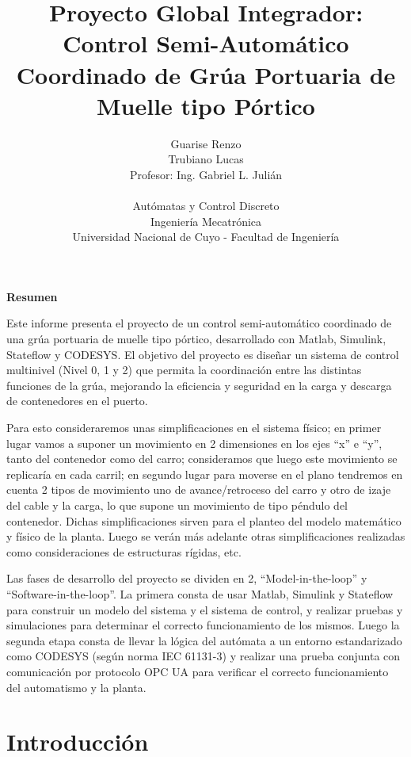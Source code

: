 \documentclass[11pt]{article}
\title{
	Proyecto Global Integrador:
	\\
	Control Semi-Automático Coordinado de Grúa Portuaria de Muelle tipo Pórtico
}
\author{
	Guarise Renzo
	\\
	Trubiano Lucas
	\\
	Profesor: Ing. Gabriel L. Julián
	\\
	\\
	Autómatas y Control Discreto
	\\
	Ingeniería Mecatrónica
	\\
	Universidad Nacional de Cuyo - Facultad de Ingeniería
}
\begin{document}
\maketitle

\begin{center} %
    {\Large \textbf{Resumen}}
\end{center}

Este informe presenta el proyecto de un control semi-automático coordinado de una grúa portuaria de muelle tipo pórtico, desarrollado con Matlab, Simulink, Stateflow y CODESYS. El objetivo del proyecto es diseñar un sistema de control multinivel (Nivel 0, 1 y 2) que permita la coordinación entre las distintas funciones de la grúa, mejorando la eficiencia y seguridad en la carga y descarga de contenedores en el puerto.
\par
Para esto consideraremos unas simplificaciones en el sistema físico; en primer lugar vamos a suponer un movimiento en 2 dimensiones en los ejes ``x'' e ``y'', tanto del contenedor como del carro; consideramos que luego este movimiento se replicaría en cada carril; en segundo lugar para moverse en el plano tendremos en cuenta 2 tipos de movimiento uno de avance/retroceso del carro y otro de izaje del cable y la carga, lo que supone un movimiento de tipo péndulo del contenedor. Dichas simplificaciones sirven para el planteo del modelo matemático y físico de la planta. Luego se verán más adelante otras simplificaciones realizadas como consideraciones de estructuras rígidas, etc.
\par
Las fases de desarrollo del proyecto se dividen en 2, “Model-in-the-loop” y “Software-in-the-loop”. La primera consta de usar Matlab, Simulink y Stateflow para construir un modelo del sistema y el sistema de control, y realizar pruebas y simulaciones para determinar el correcto funcionamiento de los mismos. Luego la segunda etapa consta de llevar la lógica del autómata a un entorno estandarizado como CODESYS (según norma IEC 61131-3) y realizar una prueba conjunta con comunicación por protocolo OPC UA para verificar el correcto funcionamiento del automatismo y la planta.



\newpage
\section{Introducción}
\end{document}
